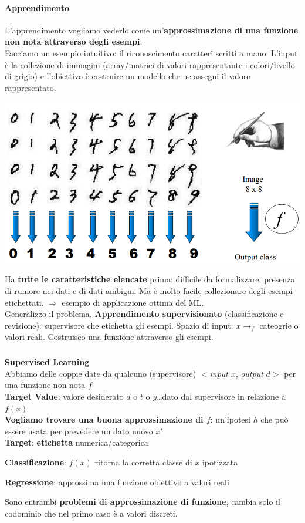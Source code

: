 \documentclass[10pt]{book}
\begin{document}
\paragraph{Apprendimento} L'apprendimento vogliamo vederlo come un'\textbf{approssimazione di una funzione non nota attraverso degli esempi}.\\
Facciamo un esempio intuitivo: il riconoscimento caratteri scritti a mano. L'input è la collezione di immagini (array/matrici di valori rappresentante i colori/livello di grigio) e l'obiettivo è costruire un modello che ne assegni il valore rappresentato.
\begin{center}
	\includegraphics[scale=0.55]{ml2.png}
\end{center}
Ha \textbf{tutte le caratteristiche elencate} prima: difficile da formalizzare, presenza di rumore nei dati e di dati ambigui. Ma è molto facile collezionare degli esempi etichettati. $\Rightarrow$ esempio di applicazione ottima del ML.\\
Generalizzo il problema. \textbf{Apprendimento supervisionato} (classificazione e revisione): supervisore che etichetta gli esempi. Spazio di input: $x \rightarrow_f$ cateogrie o valori reali. Costruisco una funzione attraverso gli esempi.
\pagebreak
\subparagraph{}\textbf{Supervised Learning}\\
Abbiamo delle coppie date da qualcuno (supervisore) $<$\textit{input} $x$, \textit{output} $d>$ per una funzione non nota $f$\\
\textbf{Target Value}: valore desiderato $d$ o $t$ o $y$\ldots dato dal supervisore in relazione a $f(x)$\\
\textbf{Vogliamo trovare una buona approssimazione di $f$}: un'ipotesi $h$ che può essere usata per prevedere un dato nuovo $x'$\\
\textbf{Target}: \textbf{etichetta} numerica/categorica
\begin{list}{}{}
	\item \textbf{Classificazione}: $f(x)$ ritorna la corretta classe di $x$ ipotizzata
	\item \textbf{Regressione}: approssima una funzione obiettivo a valori reali
\end{list}
Sono entrambi \textbf{problemi di approssimazione di funzione}, cambia solo il codominio che nel primo caso è a valori discreti.
\end{document}

